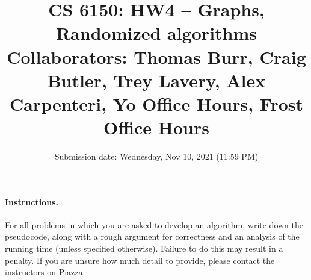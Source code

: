 \documentclass[addpoints, 11pt]{exam}
\title{CS 6150: HW4 -- Graphs, Randomized algorithms \\ 
Collaborators: Thomas Burr, Craig Butler, Trey Lavery, Alex Carpenteri, Yo Office Hours, Frost Office Hours}
\date{Submission date: Wednesday, Nov 10, 2021 (11:59 PM)}
\begin{document}
\maketitle
\begin{center}
\end{center}

\pointname{}
\bonuspointname{}
\pointformat{[\bfseries\thepoints]}

\begin{center}
  \gradetable
\end{center}
\newpage
\paragraph{Instructions.}  For all problems in which you are asked to develop an algorithm, write down the pseudocode, along with a rough argument for correctness and an analysis of the running time (unless specified otherwise). Failure to do this may result in a penalty. If you are unsure how much detail to provide, please contact the instructors on Piazza.
\end{document}
